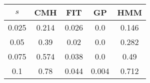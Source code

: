 \centering \begin{tabular}{c|c|c|c|c}
$s$	&CMH	&FIT	&GP	&HMM\\\hline
0.025	&0.214	&0.026	&0.0	&0.146\\
0.05	&0.39	&0.02	&0.0	&0.282\\
0.075	&0.574	&0.038	&0.0	&0.49\\
0.1	&0.78	&0.044	&0.004	&0.712\\
\end{tabular}
